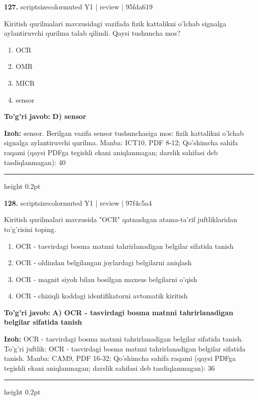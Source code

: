 \documentclass[10pt,a4paper]{article}
\begin{document}
{\bfseries\sffamily\color{ink} 127.} {scriptsizecolor{muted} Y1 | review | 95fda619}
\par
Kiritish qurilmalari mavzusidagi vazifada fizik kattalikni o'lchab signalga aylantiruvchi qurilma talab qilindi. Qaysi tushuncha mos?
\begin{enumerate}[label=\Alph*),leftmargin=9mm]
\item OCR
\item OMR
\item MICR
\item sensor
\end{enumerate}
\begin{tcolorbox}[enhanced,breakable,colback=teal!4,colframe=teal!60!black,boxrule=0.45pt,arc=1.2mm,left=2.7mm,right=2.7mm,top=1.8mm,bottom=1.8mm,before skip=2mm,after skip=2mm]
{\bfseries\sffamily\color{teal}To'g'ri javob:} \textbf{D) sensor}
\par\smallskip
{\bfseries Izoh:} sensor. Berilgan vazifa sensor tushunchasiga mos: fizik kattalikni o'lchab signalga aylantiruvchi qurilma. Manba: ICT10, PDF 8-12; Qo'shimcha sahifa raqami (qaysi PDFga tegishli ekani aniqlanmagan; darslik sahifasi deb tasdiqlanmagan): 40
\end{tcolorbox}
\vspace{2mm}\hrule height 0.2pt\vspace{3mm}

{\bfseries\sffamily\color{ink} 128.} {scriptsizecolor{muted} Y1 | review | 97f4c5a4}
\par
Kiritish qurilmalari mavzusida "OCR" qatnashgan atama-ta'rif juftliklaridan to'g'risini toping.
\begin{enumerate}[label=\Alph*),leftmargin=9mm]
\item OCR - tasvirdagi bosma matnni tahrirlanadigan belgilar sifatida tanish
\item OCR - oldindan belgilangan joylardagi belgilarni aniqlash
\item OCR - magnit siyoh bilan bosilgan maxsus belgilarni o'qish
\item OCR - chiziqli koddagi identifikatorni avtomatik kiritish
\end{enumerate}
\begin{tcolorbox}[enhanced,breakable,colback=teal!4,colframe=teal!60!black,boxrule=0.45pt,arc=1.2mm,left=2.7mm,right=2.7mm,top=1.8mm,bottom=1.8mm,before skip=2mm,after skip=2mm]
{\bfseries\sffamily\color{teal}To'g'ri javob:} \textbf{A) OCR - tasvirdagi bosma matnni tahrirlanadigan belgilar sifatida tanish}
\par\smallskip
{\bfseries Izoh:} OCR - tasvirdagi bosma matnni tahrirlanadigan belgilar sifatida tanish. To'g'ri juftlik: OCR - tasvirdagi bosma matnni tahrirlanadigan belgilar sifatida tanish. Manba: CAM9, PDF 16-32; Qo'shimcha sahifa raqami (qaysi PDFga tegishli ekani aniqlanmagan; darslik sahifasi deb tasdiqlanmagan): 36
\end{tcolorbox}
\vspace{2mm}\hrule height 0.2pt\vspace{3mm}
\end{document}
